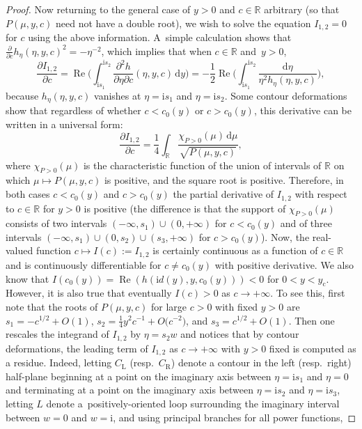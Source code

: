 \documentclass[pdftex]{sigma}
\numberwithin{equation}{section}
\begin{document}
\begin{proof}
Now returning to the general case of $y>0$ and $c\in\mathbb{R}$ arbitrary (so that $P(\mu,y,c)$ need not have a double root), we wish to solve the equation $I_{1,2}=0$ for $c$ using the above information. A~simple calculation shows that $\frac{\partial}{\partial c}h_\eta(\eta,y,c)^2 = -\eta^{-2}$, which implies that when $c\in\mathbb{R}$ and~${y>0}$, 
\begin{equation*}
\frac{\partial I_{1,2}}{\partial c}=\operatorname{Re}\bigg(\int_{\mathrm{i} s_1}^{\mathrm{i} s_2}\frac{\partial^2 h}{\partial\eta\partial c}(\eta,y,c)\,\mathrm{d} y\bigg)=-\frac{1}{2}\operatorname{Re}\bigg(\int_{\mathrm{i} s_1}^{\mathrm{i} s_2}\frac{\mathrm{d}\eta}{\eta^2 h_\eta(\eta,y,c)}\bigg),
\end{equation*}
because $h_\eta(\eta,y,c)$ vanishes at $\eta=\mathrm{i} s_1$ and $\eta=\mathrm{i} s_2$. Some contour deformations show that regardless of whether $c<c_0(y)$ or $c>c_0(y)$, this derivative can be written in a universal form:
\begin{equation*}
\frac{\partial I_{1,2}}{\partial c}=\frac{1}{4}\int_\mathbb{R}\frac{\chi_{P>0}(\mu)\,\mathrm{d}\mu}{\sqrt{P(\mu,y,c)}},
\end{equation*}
where $\chi_{P>0}(\mu)$ is the characteristic function of the union of intervals of $\mathbb{R}$ on which $\mu\mapsto P(\mu,y,c)$ is positive, and the square root is positive. Therefore, in both cases $c<c_0(y)$ and $c>c_0(y)$ the partial derivative of $I_{1,2}$ with respect to $c\in\mathbb{R}$ for $y>0$ is positive (the difference is that the support of $\chi_{P>0}(\mu)$ consists of two intervals $(-\infty,s_1)\cup (0,+\infty)$ for $c<c_0(y)$ and of three intervals $(-\infty,s_1)\cup (0,s_2)\cup (s_3,+\infty)$ for $c>c_0(y)$). Now, the real-valued function $c\mapsto I(c):=I_{1,2}$ is certainly continuous as a function of $c\in\mathbb{R}$ and is continuously differentiable for $c\neq c_0(y)$ with positive derivative. We also know that $I(c_0(y))=\operatorname{Re}(h(\mathrm{i} d(y),y,c_0(y)))<0$ for $0<y<y_\mathrm{c}$. However, it is also true that eventually $I(c)>0$ as $c\to+\infty$. To see this, first note that the roots of $P(\mu,y,c)$ for large $c>0$ with fixed $y>0$ are $s_1=-c^{1/2}+O(1)$, $s_2=\frac{1}{4}y^2c^{-1}+O\bigl(c^{-2}\bigr)$, and $s_3=c^{1/2}+O(1)$. Then one rescales the integrand of $I_{1,2}$ by $\eta=s_2w$ and notices that by contour deformations, the leading term of $I_{1,2}$ as $c\to+\infty$ with $y>0$ fixed is computed as a residue. Indeed, letting $C_\mathrm{L}$ (resp.\ $C_\mathrm{R}$) denote a contour in the left (resp.\ right) half-plane beginning at a point on the imaginary axis between $\eta=\mathrm{i} s_1$ and $\eta=0$ and terminating at a point on the imaginary axis between $\eta=\mathrm{i} s_2$ and $\eta=\mathrm{i} s_3$, letting $L$ denote a~positively-oriented loop surrounding the imaginary interval between $w=0$ and $w=\mathrm{i}$, and using principal branches for all power functions,

\end{proof}
\end{document}
